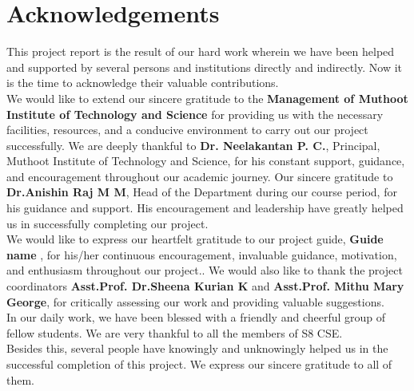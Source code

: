 \documentclass[a4paper,12pt]{template}
\numberwithin{figure}{chapter}
\numberwithin{table}{chapter}
\begin{document}
\newpage
\thispagestyle{empty}

\chapter*{Acknowledgements}
\begin{justify}
This project report is the result of our hard work wherein we have been helped and supported by several persons and institutions directly and indirectly. Now it is the time to acknowledge their valuable contributions.\\[0.5cm]
We would like to extend our sincere gratitude to the \textbf{Management of Muthoot Institute of Technology and Science}  for providing us with the necessary facilities, resources, and a conducive environment to carry out our project successfully. We are deeply thankful to  \textbf {Dr. Neelakantan P. C.}, Principal, Muthoot Institute of Technology and Science, for his constant support, guidance, and encouragement throughout our academic journey. Our sincere gratitude to \textbf{Dr.Anishin Raj M M}, Head of the Department during our course period, for his guidance and support. His encouragement and leadership have greatly helped us in successfully completing our project.\\[0.5cm]
We would like to express our heartfelt gratitude to our project guide, \textbf{Guide name} , for his/her continuous encouragement, invaluable guidance, motivation, and enthusiasm throughout our project.. We would also like to thank the project coordinators \textbf{Asst.Prof. Dr.Sheena Kurian K} and \textbf{Asst.Prof. Mithu Mary George}, for critically assessing our work and providing valuable suggestions.\\[0.5cm]
In our daily work, we have been blessed with a friendly and cheerful group of fellow students. We are very thankful to all the members of S8 CSE.\\[0.5cm]
Besides this, several people have knowingly and unknowingly helped us in the successful completion of this project. We express our sincere gratitude to all of them.    
\end{justify}


\clearpage
{}
\setcounter{page}{1}
\end{document}
